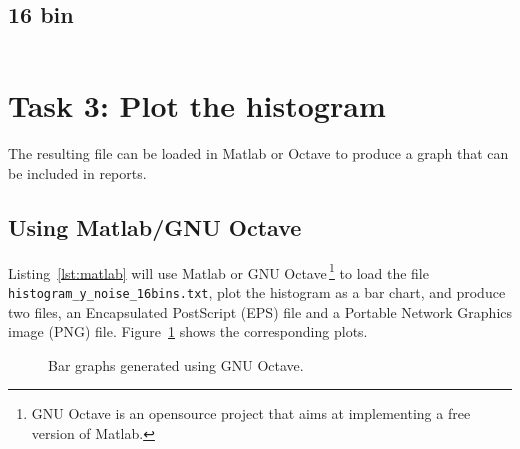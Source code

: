 \documentclass[english,a4paper,12pt,oneside]{article}
\begin{document}
\subsection*{16 bin}
\begin{center}
\begin{tabular}{cc}

\end{tabular}
\end{center}

\section*{Task 3: Plot the histogram}

The resulting file can be loaded in Matlab or Octave to produce a graph that can be included in reports. 

\subsection*{Using Matlab/GNU Octave}


Listing~\ref{lst:matlab} will use Matlab or GNU Octave\,\footnote{GNU Octave is an opensource project that aims at implementing a free version of Matlab.} to load the file \verb+histogram_y_noise_16bins.txt+, plot the histogram as a bar chart,  and produce two files, an Encapsulated PostScript (EPS) file and a Portable Network Graphics image (PNG) file.
Figure~\ref{fig:matlab} shows the corresponding plots. 

\begin{figure}[!h]
\centering
{}\hfill
{}
\caption{\label{fig:matlab}Bar graphs generated using GNU Octave.}
\end{figure}
\end{document}
